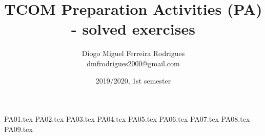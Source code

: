 \documentclass[a4paper]{article}
\title{TCOM Preparation Activities (PA) - solved exercises}
\author{Diogo Miguel Ferreira Rodrigues \\ \href{mailto:dmfrodrigues2000@gmail.com}{dmfrodrigues2000@gmail.com}}
\date{2019/2020, 1st semester}
\begin{document}
\begingroup
	\maketitle
	\let\clearpage\relax
	\setcounter{tocdepth}{2}
	\tableofcontents
\endgroup
{PA01.tex}
{PA02.tex}
{PA03.tex}
{PA04.tex}
{PA05.tex}
{PA06.tex}
{PA07.tex}
{PA08.tex}
{PA09.tex}
\end{document}

